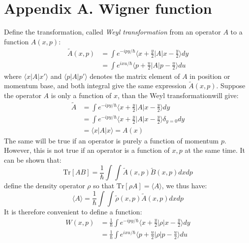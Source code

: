 \documentclass{article}
\begin{document}
\pagebreak
\section*{Appendix A. Wigner function}

Define the transformation, called \emph{Weyl transformation} from an operator $A$ to a function $A(x,p)$:
\begin{align}
    \tilde{A}(x,p)  &= \int e^{-ipy/\hbar} \langle x + \frac{y}{2} | A | x - \frac{y}{2} \rangle dy \\
                    &= \int e^{ ixu/\hbar} \langle p + \frac{u}{2} | A | p - \frac{u}{2} \rangle du
\end{align}
where $\langle x | A | x' \rangle$ and $\langle p | A | p' \rangle$ denotes the matrix element of $A$ 
in position or momentum base, and both integral give the same expression $\tilde{A}(x,p)$. 
Suppose the operator $A$ is only a function of $x$, than the Weyl transformationwill give:
\begin{align}
    \tilde{A} &= \int e^{-ipy/\hbar} \langle x + \frac{y}{2} | A | x - \frac{y}{2} \rangle dy \\
              &= \int e^{-ipy/\hbar} \langle x + \frac{y}{2} | A | x - \frac{y}{2} \rangle \delta_{y=0} dy \\
              &= \langle x | A | x \rangle = A(x)
\end{align}
The same will be true if an operator is purely a function of momentum $p$. However, this is not true 
if an operator is a function of $x,p$ at the same time.
It can be shown that:
\begin{equation}
    \text{Tr}[AB] = \frac{1}{\hbar} \int \int \tilde{A}(x,p) \tilde{B}(x,p) dx dp
\end{equation}
define the density operator $\rho$ so that $\text{Tr}[\rho A] = \langle A \rangle$, we thus have:
\begin{equation}
    \langle A \rangle = \frac{1}{\hbar} \int \int \tilde{\rho}(x,p) \tilde{A}(x,p) dx dp
\end{equation}
It is therefore convenient to define a function:
\begin{align}
    W(x,p)  &= \frac{1}{\hbar} \int e^{-ipy/\hbar} \langle x + \frac{y}{2} | \rho | x - \frac{y}{2} \rangle dy \\
            &= \frac{1}{\hbar} \int e^{ ixu/\hbar} \langle p + \frac{u}{2} | \rho | p - \frac{u}{2} \rangle du
\end{align}
\end{document}
